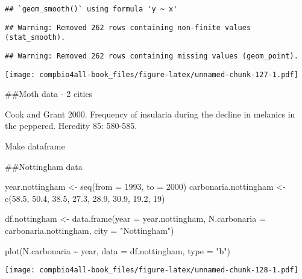 \documentclass[
]{book}
\newenvironment{Shaded}{\begin{snugshade}}{\end{snugshade}}
\newcommand{\AttributeTok}[1]{\textcolor[rgb]{0.77,0.63,0.00}{#1}}
\newcommand{\DecValTok}[1]{\textcolor[rgb]{0.00,0.00,0.81}{#1}}
\newcommand{\FloatTok}[1]{\textcolor[rgb]{0.00,0.00,0.81}{#1}}
\newcommand{\FunctionTok}[1]{\textcolor[rgb]{0.00,0.00,0.00}{#1}}
\newcommand{\NormalTok}[1]{#1}
\newcommand{\OtherTok}[1]{\textcolor[rgb]{0.56,0.35,0.01}{#1}}
\newcommand{\SpecialCharTok}[1]{\textcolor[rgb]{0.00,0.00,0.00}{#1}}
\newcommand{\StringTok}[1]{\textcolor[rgb]{0.31,0.60,0.02}{#1}}
\begin{document}
\begin{verbatim}
## `geom_smooth()` using formula 'y ~ x'
\end{verbatim}

\begin{verbatim}
## Warning: Removed 262 rows containing non-finite values (stat_smooth).
\end{verbatim}

\begin{verbatim}
## Warning: Removed 262 rows containing missing values (geom_point).
\end{verbatim}

\texttt{[image: compbio4all-book\_files/figure-latex/unnamed-chunk-127-1.pdf]}

\#\#Moth data - 2 cities

Cook and Grant 2000. Frequency of insularia during the decline
in melanics in the peppered. Heredity 85: 580-585.

Make dataframe

\#\#Nottingham data

\begin{Shaded}
\begin{Highlighting}[]
\NormalTok{year.nottingham }\OtherTok{\textless{}{-}} \FunctionTok{seq}\NormalTok{(}\AttributeTok{from =} \DecValTok{1993}\NormalTok{,}
                       \AttributeTok{to =} \DecValTok{2000}\NormalTok{)}
\NormalTok{carbonaria.nottingham }\OtherTok{\textless{}{-}} \FunctionTok{c}\NormalTok{(}\FloatTok{58.5}\NormalTok{, }\FloatTok{50.4}\NormalTok{, }\FloatTok{38.5}\NormalTok{, }\FloatTok{27.3}\NormalTok{, }\FloatTok{28.9}\NormalTok{, }
                           \FloatTok{30.9}\NormalTok{, }\FloatTok{19.2}\NormalTok{, }\DecValTok{19}\NormalTok{)}

\NormalTok{df.nottingham }\OtherTok{\textless{}{-}} \FunctionTok{data.frame}\NormalTok{(}\AttributeTok{year =}\NormalTok{ year.nottingham,}
                            \AttributeTok{N.carbonaria =}\NormalTok{ carbonaria.nottingham,}
                            \AttributeTok{city =} \StringTok{"Nottingham"}\NormalTok{)}

\FunctionTok{plot}\NormalTok{(N.carbonaria }\SpecialCharTok{\textasciitilde{}}\NormalTok{ year, }\AttributeTok{data =}\NormalTok{  df.nottingham, }\AttributeTok{type =} \StringTok{"b"}\NormalTok{)}
\end{Highlighting}
\end{Shaded}

\texttt{[image: compbio4all-book\_files/figure-latex/unnamed-chunk-128-1.pdf]}
\end{document}
